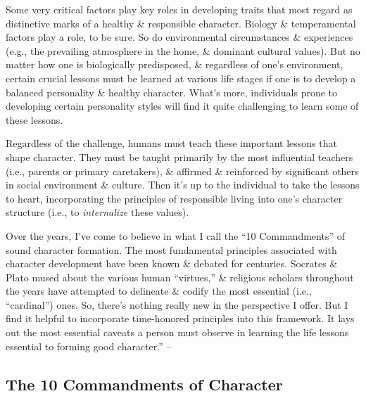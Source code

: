 \documentclass{article}
\numberwithin{equation}{section}
\begin{document}
Some very critical factors play key roles in developing traits that most regard as distinctive marks of a healthy \& responsible character. Biology \& temperamental factors play a role, to be sure. So do environmental circumstances \& experiences (e.g., the prevailing atmosphere in the home, \& dominant cultural values). But no matter how one is biologically predisposed, \& regardless of one's environment, certain crucial lessons must be learned at various life stages if one is to develop a balanced personality \& healthy character. What's more, individuals prone to developing certain personality styles will find it quite challenging to learn some of these lessons.

Regardless of the challenge, humans must teach these important lessons that shape character. They must be taught primarily by the most influential teachers (i.e., parents or primary caretakers), \& affirmed \& reinforced by significant others in social environment \& culture. Then it's up to the individual to take the lessons to heart, incorporating the principles of responsible living into one's character structure (i.e., to \textit{internalize} these values).

Over the years, I've come to believe in what I call the ``10 Commandments'' of sound character formation. The most fundamental principles associated with character development have been known \& debated for centuries. Socrates \& Plato mused about the various human ``virtues,'' \& religious scholars throughout the years have attempted to delineate \& codify the most essential (i.e., ``cardinal'') ones. So, there's nothing really new in the perspective I offer. But I find it helpful to incorporate time-honored principles into this framework. It lays out the most essential caveats a person must observe in learning the life lessons essential to forming good character.'' -- \cite[pp. 126--129]{Simon2011}

\subsection{The 10 Commandments of Character}
\end{document}
